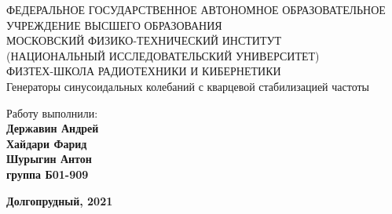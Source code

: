 \begin{center}
    {\small ФЕДЕРАЛЬНОЕ ГОСУДАРСТВЕННОЕ АВТОНОМНОЕ ОБРАЗОВАТЕЛЬНОЕ\\ УЧРЕЖДЕНИЕ ВЫСШЕГО ОБРАЗОВАНИЯ\\ МОСКОВСКИЙ ФИЗИКО-ТЕХНИЧЕСКИЙ ИНСТИТУТ\\ (НАЦИОНАЛЬНЫЙ ИССЛЕДОВАТЕЛЬСКИЙ УНИВЕРСИТЕТ)\\ ФИЗТЕХ-ШКОЛА РАДИОТЕХНИКИ И КИБЕРНЕТИКИ}\\
    \hfill \break
    \hfill \break
    \hfill \break
    \Huge{Генераторы синусоидальных колебаний с кварцевой стабилизацией частоты}\\
\end{center}
  
  \hfill \break
  \hfill \break
  \hfill \break
  \hfill \break
  \hfill \break
  \hfill \break
  
  \begin{flushright}
    \normalsize{Работу выполнили:}\\
    \normalsize{\textbf{Державин Андрей \\Хайдари Фарид \\ Шурыгин Антон \\группа Б01-909}} \\
  \end{flushright}
  
  \begin{center}
    \normalsize{\textbf{Долгопрудный, 2021}}
  \end{center}
  
  
  \thispagestyle{empty} %
  
  
  \newpage
  \thispagestyle{plain}
  \tableofcontents
  \thispagestyle{plain}
  \newpage